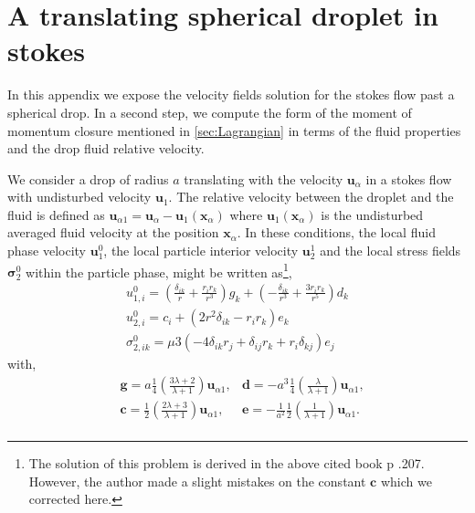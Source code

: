 


\section{A translating spherical droplet in stokes}
\label{ap:Translating_sphere}
In this appendix we expose the velocity fields solution for the stokes flow past a spherical drop. 
In a second step, we compute the form of the moment of momentum closure mentioned in \ref{sec:Lagrangian} in terms of the fluid properties and the drop fluid relative velocity.

We consider a drop of radius $a$ translating with the velocity $\textbf{u}_\alpha$ in a stokes flow with undisturbed velocity $\textbf{u}_1$.
The relative velocity between the droplet and the fluid is defined as $\textbf{u}_{\alpha 1}= \textbf{u}_\alpha - \textbf{u}_1(\textbf{x}_\alpha)$ where $\textbf{u}_1(\textbf{x}_\alpha)$ is the undisturbed averaged fluid velocity at the position $\textbf{x}_\alpha$. 
In these conditions, the local fluid phase velocity $\textbf{u}_1^0$, the local particle interior velocity $\textbf{u}_2^1$ and the local stress fields $\bm\sigma_2^0$ within the particle phase, might be written as\citet{pozrikidis1992boundary}\footnote{The solution of this problem is derived in the above cited book p .207.  However, the author made a slight mistakes on the constant $\textbf{c}$ which we corrected here. }, 
\begin{align*}
    u_{1,i}^0
    = \left(\frac{\delta_{ik}}{r} + \frac{r_ir_k}{r^3}\right)  g_k
    + \left(-\frac{\delta_{ik}}{r^3} + \frac{3r_ir_k}{r^5}\right)  d_k\\
    u_{2,i}^0
    = c_i
    + \left(2 r^2 \delta_{ik} - r_ir_k\right) e_k\\
    \sigma_{2,ik}^0
    = \mu 3(
        - 4 \delta_{ik} r_j
        + \delta_{ij} r_k
        + r_i \delta_{kj}
    )e_j 
\end{align*}
with, 
\begin{align*}
    &\textbf{g} = a\frac{1}{4}\left(\frac{3\lambda + 2}{\lambda +1}\right) \textbf{u}_{\alpha 1},
    &\textbf{d} = -a^3\frac{1}{4}\left(\frac{\lambda}{\lambda +1}\right) \textbf{u}_{\alpha 1},\\
    &\textbf{c} = \frac{1}{2}\left(\frac{2\lambda + 3}{\lambda +1}\right) \textbf{u}_{\alpha 1},
    &\textbf{e} = -\frac{1}{a^2}\frac{1}{2}\left(\frac{1}{\lambda +1}\right)  \textbf{u}_{\alpha 1}.\\
\end{align*}

